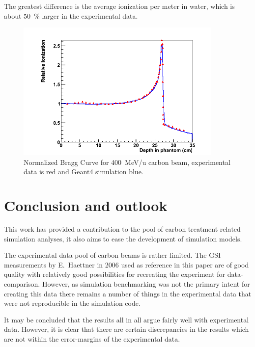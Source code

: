 The greatest difference is the average ionization per meter in water, which is about 50~\% larger in the experimental data. %


\begin{figure}[h] 
\begin{center}
\includegraphics[width=0.9\textwidth]{images/plots/braggPeak/braggPeakComparisonToData.png}  
\caption{\label{fig:braggPeakCompared} Normalized Bragg Curve for 400~MeV/u carbon beam, experimental data is red and Geant4 simulation blue.}
 \end{center}
 \end{figure}

\clearpage
\section{Conclusion and outlook}
This work has provided a contribution to the pool of carbon treatment related simulation analyses, it also aims to ease the development of simulation models.

The experimental data pool of carbon beams is rather limited. The GSI measurements by E.~Haettner in 2006 used as reference in this paper are of good quality with relatively good possibilities for recreating the experiment for data-comparison. However, as simulation benchmarking was not the primary intent for creating this data there remains a number of things in the experimental data that were not reproducible in the simulation code.

It may be concluded that the results all in all argue fairly well with experimental data. However, it is clear that there are certain discrepancies in the results which are not within the error-margins of the experimental data.

